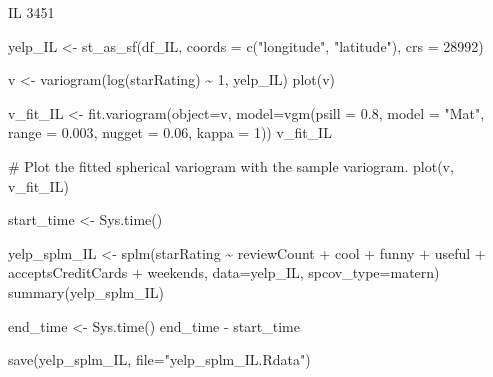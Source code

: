\documentclass[
  12pt,
  letterpaper,
  DIV=11,
  numbers=noendperiod]{scrartcl}
\newenvironment{Shaded}{\begin{snugshade}}{\end{snugshade}}
\newcommand{\AttributeTok}[1]{\textcolor[rgb]{0.98,0.46,0.51}{#1}}
\newcommand{\CommentTok}[1]{\textcolor[rgb]{0.42,0.45,0.49}{#1}}
\newcommand{\DecValTok}[1]{\textcolor[rgb]{0.47,0.72,1.00}{#1}}
\newcommand{\FloatTok}[1]{\textcolor[rgb]{0.47,0.72,1.00}{#1}}
\newcommand{\FunctionTok}[1]{\textcolor[rgb]{0.70,0.57,0.94}{#1}}
\newcommand{\NormalTok}[1]{\textcolor[rgb]{0.88,0.89,0.91}{#1}}
\newcommand{\OtherTok}[1]{\textcolor[rgb]{0.70,0.57,0.94}{#1}}
\newcommand{\SpecialCharTok}[1]{\textcolor[rgb]{0.47,0.72,1.00}{#1}}
\newcommand{\StringTok}[1]{\textcolor[rgb]{0.62,0.80,1.00}{#1}}
\begin{document}
IL 3451

\begin{Shaded}
\begin{Highlighting}[]
\NormalTok{yelp\_IL }\OtherTok{\textless{}{-}} \FunctionTok{st\_as\_sf}\NormalTok{(df\_IL, }\AttributeTok{coords =} \FunctionTok{c}\NormalTok{(}\StringTok{"longitude"}\NormalTok{, }\StringTok{"latitude"}\NormalTok{), }\AttributeTok{crs =} \DecValTok{28992}\NormalTok{)}
\end{Highlighting}
\end{Shaded}

\begin{Shaded}
\begin{Highlighting}[]
\NormalTok{v }\OtherTok{\textless{}{-}} \FunctionTok{variogram}\NormalTok{(}\FunctionTok{log}\NormalTok{(starRating) }\SpecialCharTok{\textasciitilde{}} \DecValTok{1}\NormalTok{, yelp\_IL)}
\FunctionTok{plot}\NormalTok{(v)}
\end{Highlighting}
\end{Shaded}

\begin{Shaded}
\begin{Highlighting}[]
\NormalTok{v\_fit\_IL }\OtherTok{\textless{}{-}} \FunctionTok{fit.variogram}\NormalTok{(}\AttributeTok{object=}\NormalTok{v, }
                           \AttributeTok{model=}\FunctionTok{vgm}\NormalTok{(}\AttributeTok{psill =} \FloatTok{0.8}\NormalTok{, }\AttributeTok{model =} \StringTok{"Mat"}\NormalTok{, }
                                     \AttributeTok{range =} \FloatTok{0.003}\NormalTok{, }\AttributeTok{nugget =} \FloatTok{0.06}\NormalTok{, }\AttributeTok{kappa =} \DecValTok{1}\NormalTok{))}
\NormalTok{v\_fit\_IL}

\CommentTok{\# Plot the fitted spherical variogram with the sample variogram.}
\FunctionTok{plot}\NormalTok{(v, v\_fit\_IL)}
\end{Highlighting}
\end{Shaded}

\begin{Shaded}
\begin{Highlighting}[]
\NormalTok{start\_time }\OtherTok{\textless{}{-}} \FunctionTok{Sys.time}\NormalTok{()}


\NormalTok{yelp\_splm\_IL }\OtherTok{\textless{}{-}} \FunctionTok{splm}\NormalTok{(starRating }\SpecialCharTok{\textasciitilde{}}\NormalTok{ reviewCount }\SpecialCharTok{+}\NormalTok{ cool }\SpecialCharTok{+}\NormalTok{ funny }\SpecialCharTok{+}\NormalTok{ useful }\SpecialCharTok{+}\NormalTok{ acceptsCreditCards }\SpecialCharTok{+}\NormalTok{ weekends, }\AttributeTok{data=}\NormalTok{yelp\_IL, }\AttributeTok{spcov\_type=}\StringTok{\textquotesingle{}matern\textquotesingle{}}\NormalTok{)}
\FunctionTok{summary}\NormalTok{(yelp\_splm\_IL)}

\NormalTok{end\_time }\OtherTok{\textless{}{-}} \FunctionTok{Sys.time}\NormalTok{()}
\NormalTok{end\_time }\SpecialCharTok{{-}}\NormalTok{ start\_time}
\end{Highlighting}
\end{Shaded}

\begin{Shaded}
\begin{Highlighting}[]
\FunctionTok{save}\NormalTok{(yelp\_splm\_IL, }\AttributeTok{file=}\StringTok{"yelp\_splm\_IL.Rdata"}\NormalTok{) }
\end{Highlighting}
\end{Shaded}
\end{document}
